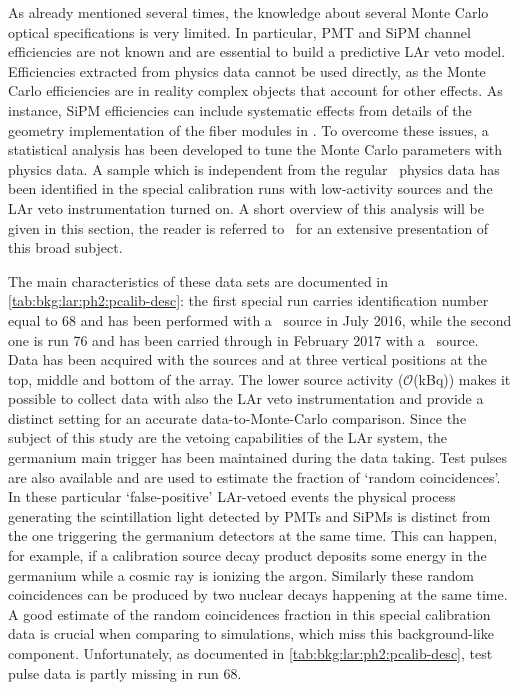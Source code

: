 As already mentioned several times, the knowledge about several Monte Carlo optical
specifications is very limited. In particular, PMT and SiPM channel efficiencies are not
known and are essential to build a predictive LAr veto model. Efficiencies extracted from
physics data cannot be used directly, as the Monte Carlo efficiencies are in reality
complex objects that account for other effects. As instance, SiPM efficiencies can include
systematic effects from details of the geometry implementation of the fiber modules in
\mage. To overcome these issues, a statistical analysis has been developed to tune the
Monte Carlo parameters with physics data. A sample which is independent from the
regular \gerda\ physics data has been identified in the special calibration runs with
low-activity sources and the LAr veto instrumentation turned on. A short overview of this
analysis will be given in this section, the reader is referred to~\cite{Wiesinger2021} for
an extensive presentation of this broad subject.

The main characteristics of these data sets are documented in
\cref{tab:bkg:lar:ph2:pcalib-desc}: the first special run carries identification number
equal to 68 and has been performed with a \Th\ source in July 2016, while the second one
is run 76 and has been carried through in February 2017 with a \Ra\ source. Data has been
acquired with the sources  and  at three vertical positions at the top, middle
and bottom of the array. The lower source activity ($\mathcal{O}$(kBq)) makes it possible
to collect data with also the LAr veto instrumentation and provide a distinct setting for
an accurate data-to-Monte-Carlo comparison. Since the subject of this study are the
vetoing capabilities of the LAr system, the germanium main trigger has been maintained
during the data taking. Test pulses are also available and are used to estimate the
fraction of `random coincidences'. In these particular `false-positive' LAr-vetoed events
the physical process generating the scintillation light detected by PMTs and SiPMs is
distinct from the one triggering the germanium detectors at the same time. This can
happen, for example, if a calibration source decay product deposits some energy in the
germanium while a cosmic ray is ionizing the argon. Similarly these random coincidences
can be produced by two nuclear decays happening at the same time. A good estimate of the
random coincidences fraction in this special calibration data is crucial when comparing to
simulations, which miss this background-like component. Unfortunately, as documented in
\cref{tab:bkg:lar:ph2:pcalib-desc}, test pulse data is partly missing in run 68.


